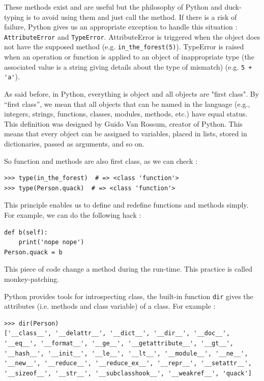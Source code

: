 \documentclass[a4paper,10pt]{article}
\begin{document}
These methods exist and are useful but the philosophy of Python and duck-typing is to avoid using them and just call the method. If there is a risk of failure, Python gives us an appropriate exception to handle this situation : \lstinline|AttributeError| and \lstinline|TypeError|. AttributeError is triggered when the object does not have the supposed method (e.g. \lstinline|in_the_forest(5)|). TypeError is raised when an operation or function is applied to an object of inappropriate type (the associated value is a string giving details about the type of mismatch) (e.g. \lstinline|5 + 'a'|).

As said before, in Python, everything is object and all objects are "first class". By “first class”, we mean that all objects that can be named in the language (e.g., integers, strings, functions, classes, modules, methods, etc.) have equal status. This definition was designed by Guido Van Rossum, creator of Python. This means that every object can be assigned to variables, placed in lists, stored in dictionaries, passed as arguments, and so on.

So function and methods are also first class, as we can check :
\begin{lstlisting}
>>> type(in_the_forest)  # => <class 'function'>
>>> type(Person.quack)  # => <class 'function'>
\end{lstlisting}

This principle enables us to define and redefine functions and methods simply. For example, we can do the following hack :

\begin{lstlisting}
def b(self):
    print('nope nope')
Person.quack = b
\end{lstlisting}


This piece of code change a method during the run-time. This practice is called monkey-patching. 

Python provides tools for introspecting class, the built-in function \lstinline|dir| gives the attributes (i.e. methods and class variable) of a class. For example :
\begin{lstlisting}
>>> dir(Person)
['__class__', '__delattr__', '__dict__', '__dir__', '__doc__', '__eq__', '__format__', '__ge__', '__getattribute__', '__gt__', '__hash__', '__init__', '__le__', '__lt__', '__module__', '__ne__', '__new__', '__reduce__', '__reduce_ex__', '__repr__', '__setattr__', '__sizeof__', '__str__', '__subclasshook__', '__weakref__', 'quack']
\end{lstlisting}
\end{document}
